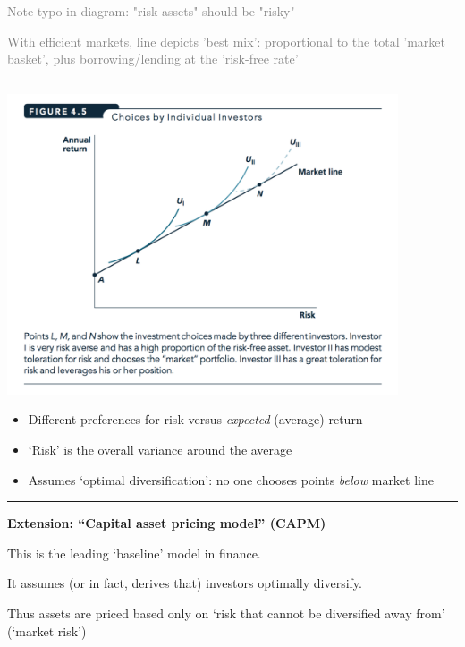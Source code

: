 \documentclass[]{article}
\providecommand{\tightlist}{%
  \setlength{\itemsep}{0pt}\setlength{\parskip}{0pt}}
\begin{document}
\textcolor{gray}{Note typo in diagram: "risk assets" should be "risky"}

\textcolor{gray}{With efficient markets, line depicts 'best mix': proportional to the total 'market basket', plus borrowing/lending at the 'risk-free rate'}

\begin{center}\rule{0.5\linewidth}{\linethickness}\end{center}

\includegraphics[height=3.5in]{picsfigs/investorchoices.png}

\begin{itemize}
\tightlist
\item
  Different preferences for risk versus \emph{expected} (average) return
\item
  `Risk' is the overall variance around the average
\item
  Assumes `optimal diversification': no one chooses points \emph{below}
  market line
\end{itemize}

\begin{center}\rule{0.5\linewidth}{\linethickness}\end{center}

\textbf{Extension: ``Capital asset pricing model'' (CAPM)}

This is the leading `baseline' model in finance.

It assumes (or in fact, derives that) investors optimally diversify.

\bigskip

Thus assets are priced based only on `risk that cannot be diversified
away from' (`market risk')
\end{document}
